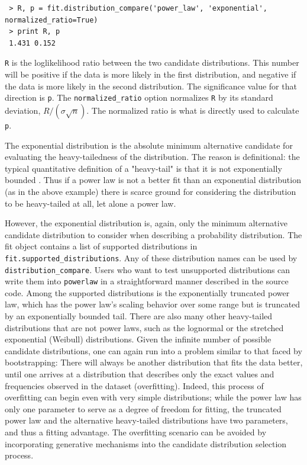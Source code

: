 \documentclass[10pt]{article}
\begin{document}
 \begin{verbatim}
 > R, p = fit.distribution_compare('power_law', 'exponential', normalized_ratio=True)
 > print R, p
 1.431 0.152
 \end{verbatim}
 
 \verb$R$ is the loglikelihood ratio between the two candidate distributions. This number will be positive if the data is more likely in the first distribution, and negative if the data is more likely in the second distribution. The significance value for that direction is \verb$p$. The \verb$normalized_ratio$ option normalizes \verb$R$ by its standard deviation, $R/(\sigma \sqrt{n})$. The normalized ratio is what is directly used to calculate \verb$p$.
 
 The exponential distribution is the absolute minimum alternative candidate for evaluating the heavy-tailedness of the distribution. The reason is definitional: the typical quantitative definition of a "heavy-tail" is that it is not exponentially bounded \cite{Asmussen2003}. Thus if a power law is not a better fit than an exponential distribution (as in the above example) there is scarce ground for considering the distribution to be heavy-tailed at all, let alone a power law. 
 
 However, the exponential distribution is, again, only the minimum alternative candidate distribution to consider when describing a probability distribution. The fit object contains a list of supported distributions in \verb$fit.supported_distributions$. Any of these distribution names can be used by \verb$distribution_compare$. Users who want to test unsupported distributions can write them into \verb$powerlaw$ in a straightforward manner described in the source code. Among the supported distributions is the exponentially truncated power law, which has the power law's scaling behavior over some range but is truncated by an exponentially bounded tail. There are also many other heavy-tailed distributions that are not power laws, such as the lognormal or the stretched exponential (Weibull) distributions. Given the infinite number of possible candidate distributions, one can again run into a problem similar to that faced by bootstrapping: There will always be another distribution that fits the data better, until one arrives at a distribution that describes only the exact values and frequencies observed in the dataset (overfitting). Indeed, this process of overfitting can begin even with very simple distributions; while the power law has only one parameter to serve as a degree of freedom for fitting, the truncated power law and the alternative heavy-tailed distributions have two parameters, and thus a fitting advantage.  The overfitting scenario can be avoided by incorporating generative mechanisms into the candidate distribution selection process.
 
\end{document}
